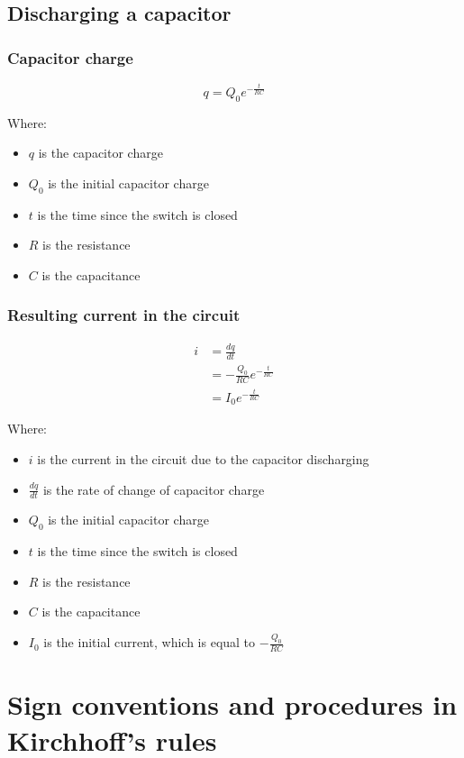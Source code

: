 \documentclass[11pt]{article}
\begin{document}
\subsection{Discharging a capacitor}
\label{sec:org96e3d74}

\subsubsection{Capacitor charge}
\label{sec:org718f5ea}
\[q = Q_0 e^{-\frac{t}{RC}}\]

Where:
\begin{itemize}
\item \(q\) is the capacitor charge
\item \(Q_0\) is the initial capacitor charge
\item \(t\) is the time since the switch is closed
\item \(R\) is the resistance
\item \(C\) is the capacitance
\end{itemize}

\subsubsection{Resulting current in the circuit}
\label{sec:org8297bc2}
\begin{align*}
i &= \frac{dq}{dt} \\
&= - \frac{Q_0}{RC} e^{-\frac{t}{RC}} \\
&= I_0 e^{- \frac{t}{RC}}
\end{align*}

Where:
\begin{itemize}
\item \(i\) is the current in the circuit due to the capacitor discharging
\item \(\frac{dq}{dt}\) is the rate of change of capacitor charge
\item \(Q_0\) is the initial capacitor charge
\item \(t\) is the time since the switch is closed
\item \(R\) is the resistance
\item \(C\) is the capacitance
\item \(I_0\) is the initial current, which is equal to \(- \frac{Q_0}{RC}\)
\end{itemize}


\section{Sign conventions and procedures in Kirchhoff's rules}
\label{sec:org8f1df81}
\end{document}
